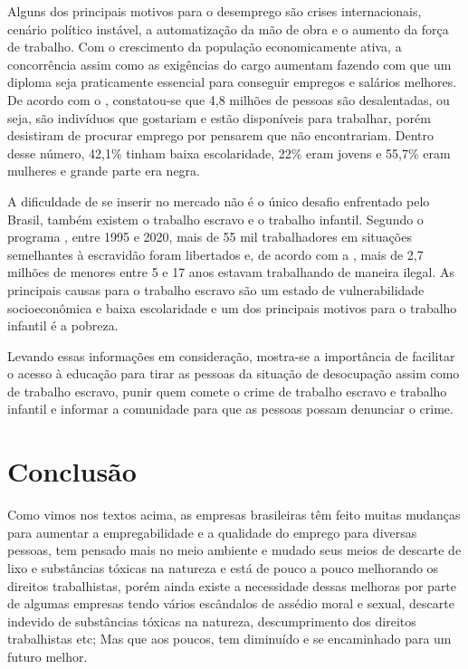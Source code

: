 \documentclass[12pt,oneside,a4paper,chapter=TITLE,section=TITLE,sumario
=tradicional]{abntex2}
\begin{document}
Alguns dos principais motivos para o desemprego são crises internacionais, cenário
político instável, a automatização da mão de obra e o aumento da força de trabalho. 
Com o crescimento da população economicamente ativa, a concorrência assim como as
exigências do cargo aumentam fazendo com que um diploma seja praticamente essencial
para conseguir empregos e salários melhores. De acordo com o , 
constatou-se que 4,8 milhões de pessoas são desalentadas, ou seja, são indivíduos que 
gostariam e estão disponíveis para trabalhar, porém desistiram de procurar emprego por 
pensarem que não encontrariam. Dentro desse número, 42,1\% tinham baixa escolaridade, 
22\% eram jovens e 55,7\% eram mulheres e grande parte era negra.

A dificuldade de se inserir no mercado não é o único desafio enfrentado pelo Brasil,
também existem o trabalho escravo e o trabalho infantil. Segundo o programa , 
entre 1995 e 2020, mais de 55 mil trabalhadores em situações semelhantes
à escravidão foram libertados e, de acordo com a , mais de 2,7 milhões de menores entre 5 e 17 anos estavam
trabalhando de maneira ilegal. As principais causas para o trabalho escravo são um 
estado de vulnerabilidade socioeconômica e baixa escolaridade e um dos principais
motivos para o trabalho infantil é a pobreza. 

Levando essas informações em consideração, mostra-se a importância de facilitar o 
acesso à educação para tirar as pessoas da situação de desocupação assim como de 
trabalho escravo, punir quem comete o crime de trabalho escravo e trabalho infantil 
e informar a comunidade para que as pessoas possam denunciar o crime.

\chapter{Conclusão}

Como vimos nos textos acima, as empresas brasileiras têm feito muitas mudanças para aumentar a empregabilidade e a qualidade do emprego para diversas pessoas, tem pensado mais no meio ambiente e mudado seus meios de descarte de lixo e substâncias tóxicas na natureza e está de pouco a pouco melhorando os direitos trabalhistas, porém ainda existe a necessidade dessas melhoras por parte de algumas empresas tendo vários escândalos de assédio moral e sexual, descarte indevido de substâncias tóxicas na natureza, descumprimento dos direitos trabalhistas etc; Mas que aos poucos, tem diminuído e se encaminhado para um futuro melhor.



\end{document}
